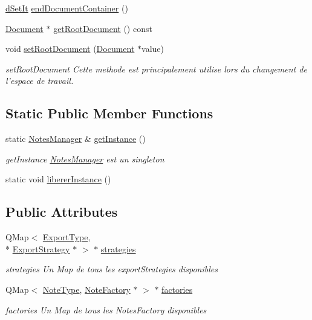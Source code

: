 \begin{DoxyCompactItemize}
\hyperlink{_notes_manager_8h_a6979f3cb5cacc239c7b1683577be1eb6}{d\-Set\-It} \hyperlink{class_notes_manager_a858397ffd5a1ed3c6c80c44c08ca4601}{end\-Document\-Container} ()
\item 
\hyperlink{class_document}{Document} $\ast$ \hyperlink{class_notes_manager_aa8a214956e988b24605c9bf6fcec4960}{get\-Root\-Document} () const 
\item 
void \hyperlink{class_notes_manager_a118b3a8e58bd06c8571b799c40acd1c7}{set\-Root\-Document} (\hyperlink{class_document}{Document} $\ast$value)
\begin{DoxyCompactList}\small\item\em set\-Root\-Document Cette methode est principalement utilise lors du changement de l'espace de travail. \end{DoxyCompactList}\end{DoxyCompactItemize}
\subsection*{Static Public Member Functions}
\begin{DoxyCompactItemize}
\item 
static \hyperlink{class_notes_manager}{Notes\-Manager} \& \hyperlink{class_notes_manager_a7311347da4088a6622955e46d53e7599}{get\-Instance} ()
\begin{DoxyCompactList}\small\item\em get\-Instance \hyperlink{class_notes_manager}{Notes\-Manager} est un singleton \end{DoxyCompactList}\item 
static void \hyperlink{class_notes_manager_abd12bae3c990a408e9ef55aa0d93b675}{liberer\-Instance} ()
\end{DoxyCompactItemize}
\subsection*{Public Attributes}
\begin{DoxyCompactItemize}
\item 
Q\-Map$<$ \hyperlink{_export_strategy_8h_a6bd23bde1932319c9832c0129a94b307}{Export\-Type}, \\*
\hyperlink{class_export_strategy}{Export\-Strategy} $\ast$ $>$ $\ast$ \hyperlink{class_notes_manager_a76009ca9ef3ceaf21dfb51fbe796b7ff}{strategies}
\begin{DoxyCompactList}\small\item\em strategies Un Map de tous les export\-Strategies disponibles \end{DoxyCompactList}\item 
Q\-Map$<$ \hyperlink{_note_factory_8h_a0e0de7dc7864c9c2e738e017dce974be}{Note\-Type}, \hyperlink{class_note_factory}{Note\-Factory} $\ast$ $>$ $\ast$ \hyperlink{class_notes_manager_acc3391f8fb05d1dd36bce98620915574}{factories}
\begin{DoxyCompactList}\small\item\em factories Un Map de tous les Notes\-Factory disponibles \end{DoxyCompactList}\end{DoxyCompactItemize}


